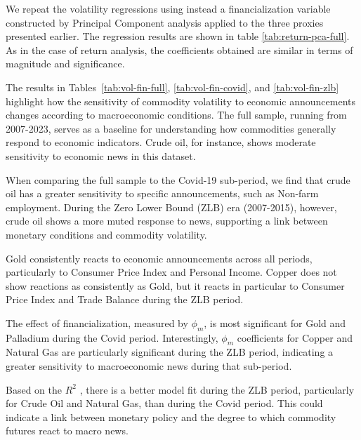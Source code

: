 We repeat the volatility regressions using instead a financialization variable constructed by Principal Component analysis applied to the three proxies presented earlier. The regression results are shown in table \ref{tab:return-pca-full}. As in the case of return analysis, the coefficients obtained are similar in terms of magnitude and significance.


The results in Tables~\ref{tab:vol-fin-full}, \ref{tab:vol-fin-covid}, and \ref{tab:vol-fin-zlb} highlight how the sensitivity of commodity volatility to economic announcements changes according to macroeconomic conditions. The full sample, running from 2007-2023, serves as a baseline for understanding how commodities generally respond to economic indicators. Crude oil, for instance, shows moderate sensitivity to economic news in this  dataset.

When comparing the full sample to the Covid-19 sub-period, we find that crude oil has a greater sensitivity to specific announcements, such as Non-farm employment. During the Zero Lower Bound (ZLB) era (2007-2015), however, crude oil shows a more muted response to news, supporting a link between monetary conditions and commodity volatility.

Gold consistently reacts to economic announcements across all periods, particularly to Consumer Price Index and Personal Income. Copper does not show reactions as consistently as Gold, but it reacts in particular to  Consumer Price Index and Trade Balance during the ZLB period.


The effect of financialization, measured by $\phi_m$, is most significant for Gold and Palladium during the Covid period.  Interestingly, $\phi_m$ coefficients for  Copper and Natural Gas are particularly significant during the ZLB period, indicating a greater sensitivity to macroeconomic news during that sub-period.


Based on the $R^2$ , there is a better model fit during the ZLB period, particularly for Crude Oil and Natural Gas, than during the Covid period. This could indicate a link between monetary policy and the degree to which commodity futures react to macro news.%

